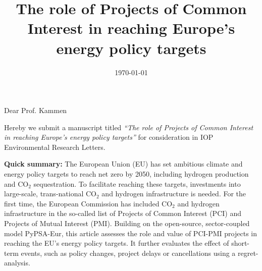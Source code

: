 \documentclass[10pt,a4paper,roman]{moderncv}        %
\title{The role of Projects of Common Interest in reaching Europe's energy policy targets}
\begin{document}
\date{\today}

\subject{Cover letter for manuscript submission\vspace{-0.6cm}}
\opening{Dear Prof. Kammen}
\makelettertitle
\justifying
Hereby we submit a manuscript titled \textit{\enquote{The role of Projects of Common Interest in reaching Europe's energy policy targets}} for consideration in IOP Environmental Research Letters. 

\textbf{Quick summary:} The European Union (EU) has set ambitious climate and energy policy targets to reach net zero by 2050, including hydrogen production and CO$_2$ sequestration. To facilitate reaching these targets, investments into large-scale, trans-national CO$_2$ and hydrogen infrastructure is needed. For the first time, the European Commission has included CO$_2$ and hydrogen infrastructure in the so-called list of Projects of Common Interest (PCI) and Projects of Mutual Interest (PMI). Building on the open-source, sector-coupled model PyPSA-Eur, this article assesses the role and value of PCI-PMI projects in reaching the EU's energy policy targets. It further evaluates the effect of short-term events, such as policy changes, project delays or cancellations using a regret-analysis.
\end{document}
